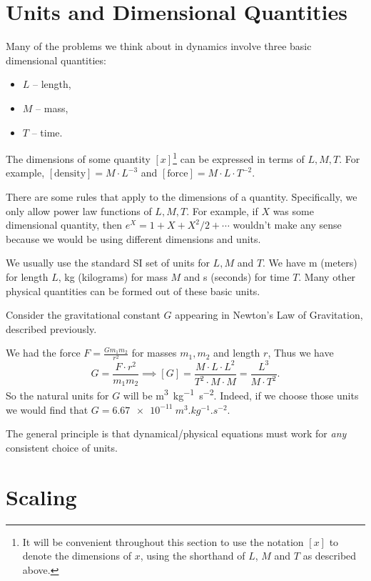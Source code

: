 \documentclass[a4paper]{scrreprt}
\begin{document}
\section{Units and Dimensional Quantities}

Many of the problems we think about in dynamics involve three basic dimensional quantities: 
\begin{itemize}
	\item $L$ -- length,
	\item $M$ -- mass,
	\item $T$ -- time.
\end{itemize}
The dimensions of some quantity $[x]$\footnote{It will be convenient throughout this section to use the notation $[x]$ to denote the dimensions of $x$, using the shorthand of $L$, $M$ and $T$ as described above.} can be expressed in terms of $L, M, T$.
For example, $[\text{density}] = M \cdot L^{-3}$ and $[\text{force}] = M \cdot L \cdot T^{-2}$.

There are some rules that apply to the dimensions of a quantity. Specifically, we only allow power law functions of $L, M, T$. 
For example, if $X$ was some dimensional quantity, then $e^X = 1 + X + X^2/2 + \cdots$ wouldn't make any sense because we would be using different dimensions and units.

We usually use the standard SI set of units for $L, M$ and $T$. We have \si{m} (meters) for length $L$, \si{kg} (kilograms) for mass $M$ and \si{s} (seconds) for time $T$. Many other physical quantities can be formed out of these basic units. 

\begin{example}
	Consider the gravitational constant $G$ appearing in Newton's Law of Gravitation, described previously.

	We had the force $F = \frac{Gm_1 m_2}{r^2}$ for masses $m_1, m_2$ and length $r$, Thus we have
$$
	G = \frac{F \cdot r^2}{m_1 m_2} \implies [G] = \frac{M \cdot L \cdot L^2}{T^2 \cdot M \cdot M} = \frac{L^3}{M \cdot T^2}.
$$
So the natural units for $G$ will be \si{m^3 .kg^{-1}. s^{-2}}. Indeed, if we choose those units we would find that $G = \SI{6.67e-11}{m^3 .kg^{-1}. s^{-2}}$.
\end{example}

The general principle is that dynamical/physical equations must work for \emph{any} consistent choice of units.

\section{Scaling}
\end{document}
